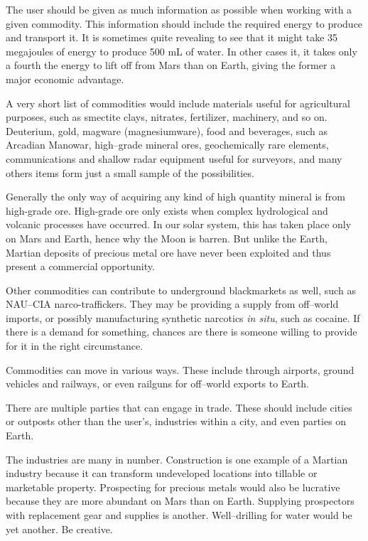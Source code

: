 The user should be given as much information as possible when working with a given commodity. This information should include the required energy to produce and transport it. It is sometimes quite revealing to see that it might take 35 megajoules of energy to produce 500 mL of water. In other cases it, it takes only a fourth the energy to lift off from Mars than on Earth, giving the former a major economic advantage.

A very short list of commodities would include materials useful for agricultural purposes, such as smectite clays, nitrates, fertilizer, machinery, and so on. Deuterium, gold, magware (magnesiumware), food and beverages, such as Arcadian Manowar, high--grade mineral ores, geochemically rare elements, communications and shallow radar equipment useful for surveyors, and many others items form just a small sample of the possibilities.

Generally the only way of acquiring any kind of high quantity mineral is from high-grade ore. High-grade ore only exists when complex hydrological and volcanic processes have occurred. In our solar system, this has taken place only on Mars and Earth, hence why the Moon is barren. But unlike the Earth, Martian deposits of precious metal ore have never been exploited and thus present a commercial opportunity.

Other commodities can contribute to underground blackmarkets as well, such as NAU--CIA narco-traffickers. They may be providing a supply from off--world imports, or possibly manufacturing synthetic narcotics {\it in situ}, such as cocaine. If there is a demand for something, chances are there is someone willing to provide for it in the right circumstance.

Commodities can move in various ways. These include through airports, ground vehicles and railways, or even railguns for off--world exports to Earth.

There are multiple parties that can engage in trade. These should include cities or outposts other than the user's, industries within a city, and even parties on Earth.

The industries are many in number. Construction is one example of a Martian industry because it can transform undeveloped locations into tillable or marketable property. Prospecting for precious metals would also be lucrative because they are more abundant on Mars than on Earth. Supplying prospectors with replacement gear and supplies is another. Well--drilling for water would be yet another. Be creative.


